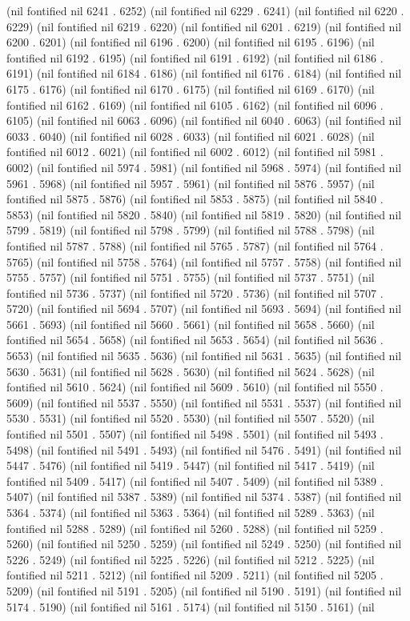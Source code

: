 (nil fontified nil 6241 . 6252) (nil fontified nil 6229 . 6241) (nil fontified nil 6220 . 6229) (nil fontified nil 6219 . 6220) (nil fontified nil 6201 . 6219) (nil fontified nil 6200 . 6201) (nil fontified nil 6196 . 6200) (nil fontified nil 6195 . 6196) (nil fontified nil 6192 . 6195) (nil fontified nil 6191 . 6192) (nil fontified nil 6186 . 6191) (nil fontified nil 6184 . 6186) (nil fontified nil 6176 . 6184) (nil fontified nil 6175 . 6176) (nil fontified nil 6170 . 6175) (nil fontified nil 6169 . 6170) (nil fontified nil 6162 . 6169) (nil fontified nil 6105 . 6162) (nil fontified nil 6096 . 6105) (nil fontified nil 6063 . 6096) (nil fontified nil 6040 . 6063) (nil fontified nil 6033 . 6040) (nil fontified nil 6028 . 6033) (nil fontified nil 6021 . 6028) (nil fontified nil 6012 . 6021) (nil fontified nil 6002 . 6012) (nil fontified nil 5981 . 6002) (nil fontified nil 5974 . 5981) (nil fontified nil 5968 . 5974) (nil fontified nil 5961 . 5968) (nil fontified nil 5957 . 5961) (nil fontified nil 5876 . 5957) (nil fontified nil 5875 . 5876) (nil fontified nil 5853 . 5875) (nil fontified nil 5840 . 5853) (nil fontified nil 5820 . 5840) (nil fontified nil 5819 . 5820) (nil fontified nil 5799 . 5819) (nil fontified nil 5798 . 5799) (nil fontified nil 5788 . 5798) (nil fontified nil 5787 . 5788) (nil fontified nil 5765 . 5787) (nil fontified nil 5764 . 5765) (nil fontified nil 5758 . 5764) (nil fontified nil 5757 . 5758) (nil fontified nil 5755 . 5757) (nil fontified nil 5751 . 5755) (nil fontified nil 5737 . 5751) (nil fontified nil 5736 . 5737) (nil fontified nil 5720 . 5736) (nil fontified nil 5707 . 5720) (nil fontified nil 5694 . 5707) (nil fontified nil 5693 . 5694) (nil fontified nil 5661 . 5693) (nil fontified nil 5660 . 5661) (nil fontified nil 5658 . 5660) (nil fontified nil 5654 . 5658) (nil fontified nil 5653 . 5654) (nil fontified nil 5636 . 5653) (nil fontified nil 5635 . 5636) (nil fontified nil 5631 . 5635) (nil fontified nil 5630 . 5631) (nil fontified nil 5628 . 5630) (nil fontified nil 5624 . 5628) (nil fontified nil 5610 . 5624) (nil fontified nil 5609 . 5610) (nil fontified nil 5550 . 5609) (nil fontified nil 5537 . 5550) (nil fontified nil 5531 . 5537) (nil fontified nil 5530 . 5531) (nil fontified nil 5520 . 5530) (nil fontified nil 5507 . 5520) (nil fontified nil 5501 . 5507) (nil fontified nil 5498 . 5501) (nil fontified nil 5493 . 5498) (nil fontified nil 5491 . 5493) (nil fontified nil 5476 . 5491) (nil fontified nil 5447 . 5476) (nil fontified nil 5419 . 5447) (nil fontified nil 5417 . 5419) (nil fontified nil 5409 . 5417) (nil fontified nil 5407 . 5409) (nil fontified nil 5389 . 5407) (nil fontified nil 5387 . 5389) (nil fontified nil 5374 . 5387) (nil fontified nil 5364 . 5374) (nil fontified nil 5363 . 5364) (nil fontified nil 5289 . 5363) (nil fontified nil 5288 . 5289) (nil fontified nil 5260 . 5288) (nil fontified nil 5259 . 5260) (nil fontified nil 5250 . 5259) (nil fontified nil 5249 . 5250) (nil fontified nil 5226 . 5249) (nil fontified nil 5225 . 5226) (nil fontified nil 5212 . 5225) (nil fontified nil 5211 . 5212) (nil fontified nil 5209 . 5211) (nil fontified nil 5205 . 5209) (nil fontified nil 5191 . 5205) (nil fontified nil 5190 . 5191) (nil fontified nil 5174 . 5190) (nil fontified nil 5161 . 5174) (nil fontified nil 5150 . 5161) (nil 